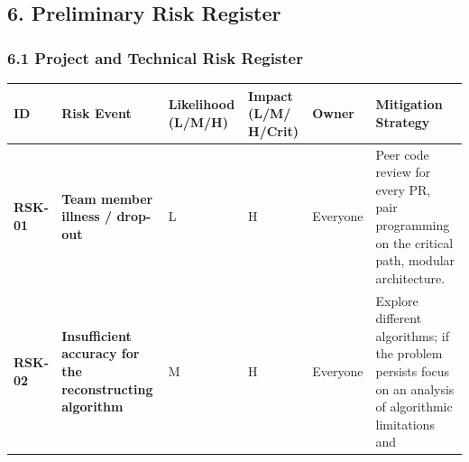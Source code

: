 \documentclass[
]{article}
\newcounter{none} %
\begin{document}
\subsection{6. Preliminary Risk
Register}\label{preliminary-risk-register}

\subsubsection{6.1 Project and Technical Risk
Register}\label{project-and-technical-risk-register}

{\def\LTcaptype{none} %
\begin{longtable}[]{@{}
  >{\raggedright\arraybackslash}p{}
  >{\raggedright\arraybackslash}p{}
  >{\raggedright\arraybackslash}p{}
  >{\raggedright\arraybackslash}p{}
  >{\raggedright\arraybackslash}p{}
  >{\raggedright\arraybackslash}p{}@{}}
\toprule\noalign{}
\begin{minipage}[b]{\linewidth}\raggedright
ID
\end{minipage} & \begin{minipage}[b]{\linewidth}\raggedright
Risk Event
\end{minipage} & \begin{minipage}[b]{\linewidth}\raggedright
Likelihood (L/M/H)
\end{minipage} & \begin{minipage}[b]{\linewidth}\raggedright
Impact (L/M/ H/Crit)
\end{minipage} & \begin{minipage}[b]{\linewidth}\raggedright
Owner
\end{minipage} & \begin{minipage}[b]{\linewidth}\raggedright
Mitigation Strategy
\end{minipage} \\
\midrule\noalign{}
\endhead
\bottomrule\noalign{}
\endlastfoot
\textbf{RSK-01} & \textbf{Team member illness / drop-out} & L & H &
Everyone & Peer code review for every PR, pair programming on the
critical path, modular architecture. \\
\textbf{RSK-02} & \textbf{Insufficient accuracy for the reconstructing
algorithm} & M & H & Everyone & Explore different algorithms; if the
problem persists focus on an analysis of algorithmic limitations and

\end{longtable}}
\end{document}

